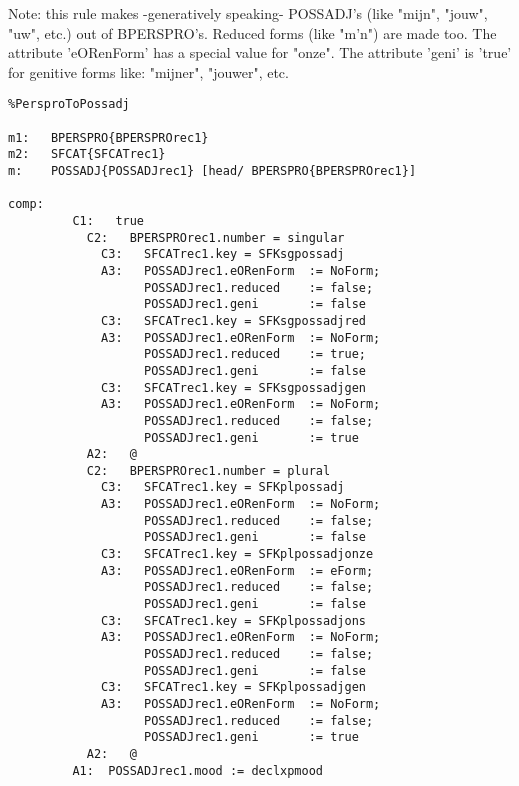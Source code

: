 Note: this rule makes -generatively speaking- POSSADJ's (like "mijn", "jouw", 
      "uw", etc.) out of BPERSPRO's. Reduced forms (like "m'n") are made too.
      The attribute 'eORenForm' has a special value for "onze".
      The attribute 'geni' is 'true' for genitive forms like: "mijner", 
      "jouwer", etc.
\begin{verbatim}
%PersproToPossadj

m1:   BPERSPRO{BPERSPROrec1}
m2:   SFCAT{SFCATrec1}
m:    POSSADJ{POSSADJrec1} [head/ BPERSPRO{BPERSPROrec1}]

comp:    
         C1:   true
           C2:   BPERSPROrec1.number = singular
             C3:   SFCATrec1.key = SFKsgpossadj
             A3:   POSSADJrec1.eORenForm  := NoForm;
                   POSSADJrec1.reduced    := false;
                   POSSADJrec1.geni       := false
             C3:   SFCATrec1.key = SFKsgpossadjred
             A3:   POSSADJrec1.eORenForm  := NoForm;
                   POSSADJrec1.reduced    := true;
                   POSSADJrec1.geni       := false
             C3:   SFCATrec1.key = SFKsgpossadjgen
             A3:   POSSADJrec1.eORenForm  := NoForm;
                   POSSADJrec1.reduced    := false;
                   POSSADJrec1.geni       := true
           A2:   @
           C2:   BPERSPROrec1.number = plural
             C3:   SFCATrec1.key = SFKplpossadj
             A3:   POSSADJrec1.eORenForm  := NoForm;
                   POSSADJrec1.reduced    := false;
                   POSSADJrec1.geni       := false
             C3:   SFCATrec1.key = SFKplpossadjonze
             A3:   POSSADJrec1.eORenForm  := eForm;
                   POSSADJrec1.reduced    := false;
                   POSSADJrec1.geni       := false
             C3:   SFCATrec1.key = SFKplpossadjons
             A3:   POSSADJrec1.eORenForm  := NoForm;
                   POSSADJrec1.reduced    := false;
                   POSSADJrec1.geni       := false
             C3:   SFCATrec1.key = SFKplpossadjgen
             A3:   POSSADJrec1.eORenForm  := NoForm;
                   POSSADJrec1.reduced    := false;
                   POSSADJrec1.geni       := true
           A2:   @
         A1:  POSSADJrec1.mood := declxpmood


\end{verbatim}
